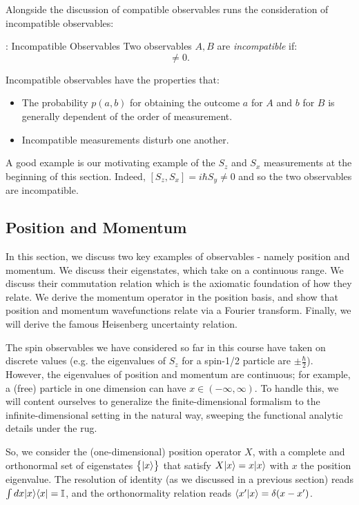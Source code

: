 Alongside the discussion of compatible observables runs the consideration of incompatible observables:

\begin{defbox}{: Incompatible Observables}
    Two observables $A, B$ are \emph{incompatible} if:
    \begin{equation}
        [A, B] \neq 0.
    \end{equation}
\end{defbox}
Incompatible observables have the properties that: 
\begin{itemize}
    \item The probability $p(a, b)$ for obtaining the outcome $a$ for $A$ and $b$ for $B$ is generally dependent of the order of measurement.
    \item Incompatible measurements disturb one another.
\end{itemize}
A good example is our motivating example of the $S_z$ and $S_x$ measurements at the beginning of this section. Indeed, $[S_z, S_x] = i\hbar S_y \neq 0$ and so the two observables are incompatible.  

\subsection{Position and Momentum}
In this section, we discuss two key examples of observables - namely position and momentum. We discuss their eigenstates, which take on a continuous range. We discuss their commutation relation which is the axiomatic foundation of how they relate. We derive the momentum operator in the position basis, and show that position and momentum wavefunctions relate via a Fourier transform. Finally, we will derive the famous Heisenberg uncertainty relation.

The spin observables we have considered so far in this course have taken on discrete values (e.g. the eigenvalues of $S_z$ for a spin-1/2 particle are $\pm \frac{\hbar}{2}$). However, the eigenvalues of position and momentum are continuous; for example, a (free) particle in one dimension can have $x \in (-\infty, \infty)$. To handle this, we will content ourselves to generalize the finite-dimensional formalism to the infinite-dimensional setting in the natural way, sweeping the functional analytic details under the rug.

So, we consider the (one-dimensional) position operator $X$, with a complete and orthonormal set of eigenstates $\set{\lvert x \rangle}$ that satisfy $X\lvert x \rangle = x\lvert x \rangle$ with $x$ the position eigenvalue. The resolution of identity (as we discussed in a previous section) reads $\int dx \lvert x \rangle \langle x \rvert = \mathbb{I}$, and the orthonormality relation reads $\langle x' \lvert x \rangle = \delta(x - x')$. 

